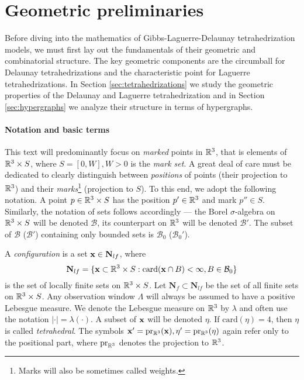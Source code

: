\chapter{Geometric preliminaries}\label{ch:1}

Before diving into the mathematics of Gibbs-Laguerre-Delaunay tetrahedrization models, we must first lay out the fundamentals of their geometric and combinatorial structure. The key geometric components are the circumball for Delaunay tetrahedrizations and the characteristic point for Laguerre tetrahedrizations. 
In Section \ref{sec:tetrahedrizations} we study the geometric properties of the Delaunay and Laguerre tetrahedrization and in Section \ref{sec:hypergraphs} we analyze their structure in terms of hypergraphs.

\subsubsection{Notation and basic terms}
This text will predominantly focus on \textit{marked} points in ${\mathbb R^3}$, that is elements of ${\mathbb R^3} \times S$, where $S=[0,W],W>0$ is the \textit{mark set}. A great deal of care must be dedicated to clearly distinguish between \textit{positions} of points (their projection to ${\mathbb R^3}$) and their \textit{marks}\footnote{Marks will also be sometimes called weights.} (projection to $S$). To this end, we adopt the following notation. A point $p \in {\mathbb R^3}\times S$ has the position $p'\in {\mathbb R^3}$ and mark $p'' \in S$. Similarly, the notation of sets follows accordingly --- the Borel $\sigma$-algebra on ${\mathbb R^3}\times S$ will be denoted $\mathcal B$, its counterpart on ${\mathbb R^3}$ will be denoted $\mathcal B'$. The subset of $\mathcal B$ ($\mathcal B'$) containing only bounded sets is $\mathcal B_0$ ($\mathcal B_0'$). 

A \textit{configuration} is a set ${\mathbf{x}} \in \mathbf N_{lf}$, where 
$$\mathbf N_{lf} = \{{\mathbf{x}} \subset {\mathbb R^3}\times S: \mathrm{card}({\mathbf{x}} \cap B) < \infty, B\in \mathcal B_0\} $$ 
is the set of locally finite sets on ${\mathbb R^3}\times S$. Let $\mathbf N_{f} \subset \mathbf N_{lf}$ be the set of all finite sets on ${\mathbb R^3}\times S$. 
 Any observation window $\Lambda$ will always be assumed to have a positive Lebesgue measure. We denote the Lebesgue measure on ${\mathbb R^3}$ by $\lambda$ and often use the notation $|\cdot|=\lambda(\cdot)$.
A subset of ${\mathbf{x}}$ will be denoted $\eta$. If $\mathrm{card}(\eta)=4$, then $\eta$ is called \textit{tetrahedral}. The symbols ${\mathbf{x}}'=\mathrm{pr_{{\mathbb R^3}}}({\mathbf{x}}), \eta'=\mathrm{pr_{{\mathbb R^3}}}(\eta)$ again refer only to the positional part, where $\mathrm{pr}_{\mathbb R^3}$ denotes the projection to ${\mathbb R^3}$. 

